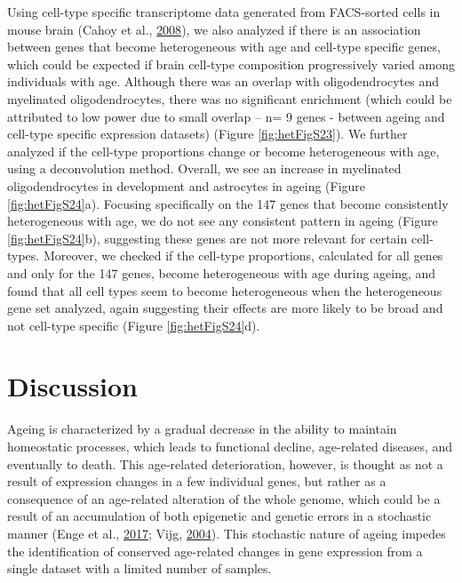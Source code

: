 \documentclass[12pt,twoside]{unicam}
\begin{document}
Using cell-type specific transcriptome data generated from FACS-sorted cells in mouse brain (Cahoy et al., \protect\hyperlink{ref-Cahoy2008}{2008}), we also analyzed if there is an association between genes that become heterogeneous with age and cell-type specific genes, which could be expected if brain cell-type composition progressively varied among individuals with age. Although there was an overlap with oligodendrocytes and myelinated oligodendrocytes, there was no significant enrichment (which could be attributed to low power due to small overlap -- n= 9 genes - between ageing and cell-type specific expression datasets) (Figure \ref{fig:hetFigS23}). We further analyzed if the cell-type proportions change or become heterogeneous with age, using a deconvolution method. Overall, we see an increase in myelinated oligodendrocytes in development and astrocytes in ageing (Figure \ref{fig:hetFigS24}a). Focusing specifically on the 147 genes that become consistently heterogeneous with age, we do not see any consistent pattern in ageing (Figure \ref{fig:hetFigS24}b), suggesting these genes are not more relevant for certain cell-types. Moreover, we checked if the cell-type proportions, calculated for all genes and only for the 147 genes, become heterogeneous with age during ageing, and found that all cell types seem to become heterogeneous when the heterogeneous gene set analyzed, again suggesting their effects are more likely to be broad and not cell-type specific (Figure \ref{fig:hetFigS24}d).

\hypertarget{discussion}{%
\section{Discussion}\label{discussion}}

Ageing is characterized by a gradual decrease in the ability to maintain homeostatic processes, which leads to functional decline, age-related diseases, and eventually to death. This age-related deterioration, however, is thought as not a result of expression changes in a few individual genes, but rather as a consequence of an age-related alteration of the whole genome, which could be a result of an accumulation of both epigenetic and genetic errors in a stochastic manner (Enge et al., \protect\hyperlink{ref-Enge2017}{2017}; Vijg, \protect\hyperlink{ref-Vijg2004}{2004}). This stochastic nature of ageing impedes the identification of conserved age-related changes in gene expression from a single dataset with a limited number of samples.
\end{document}

